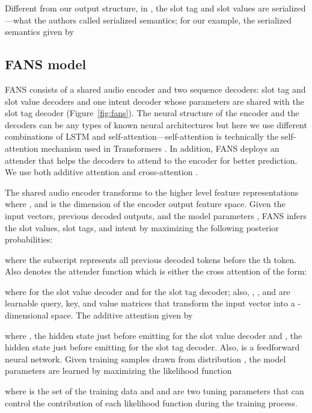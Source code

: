\documentclass[a4paper]{article}
\begin{document}
 Different from our output structure, in  \cite{haghani2018audio}, the slot tag and slot values are serialized---what the authors called serialized semantics; for our example,  the serialized semantics given by   


 \subsection{FANS model} 
FANS consists of a shared audio encoder and two sequence decoders: slot tag and slot value decoders and one intent decoder whose parameters are shared with the slot tag decoder (Figure~\ref{fig:fans}). The neural structure of the encoder and the decoders can be any types of known neural architectures but here we use  different combinations of LSTM and self-attention---self-attention is technically  the self-attention mechanism used in Transformers \cite{vaswani2017attention} .  In addition, FANS deploys an attender that helps the decoders to attend to the encoder for better prediction.  We use both  additive attention \cite{bahdanau2014neural} and cross-attention  \cite{vaswani2017attention}.

The shared audio encoder  transforms  to the  higher level feature representations   where , and  is the dimension of the  encoder output feature space.    Given the input vectors, previous decoded outputs, and the model parameters , FANS infers the slot values, slot tags, and intent by maximizing the following posterior probabilities: 
 
 where the subscript  represents all previous decoded tokens before the th token. Also  denotes the attender function which is either the cross attention of the form:
 
where  for the slot value decoder and  for the slot tag decoder; also, , , and  are learnable query, key, and value matrices that transform the input vector into a  -dimensional space. The additive attention  given by 

 where , the hidden state just before emitting  for  the slot value decoder and , the hidden state just before emitting  for  the slot tag decoder. Also,   is a feedforward neural network. Given  training samples drawn from distribution , the model parameters  are learned by maximizing the likelihood function
 
where  is  the set of the training data and  and  are two tuning parameters that can control the contribution of each likelihood function during the training process.

  
 
\end{document}
